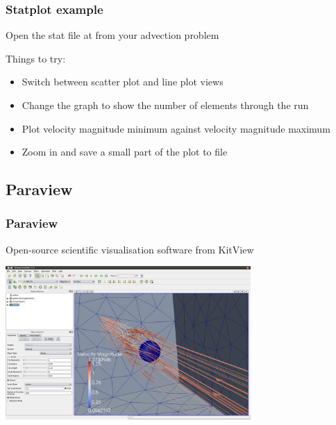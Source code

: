 \documentclass[12pt]{beamer}
\begin{document}
\begin{frame}
    \frametitle{Statplot example}
Open the stat file at from your advection problem

Things to try:
\begin{itemize}
\item Switch between scatter plot and line plot views
\item Change the graph to show the number of elements through the run
\item Plot velocity magnitude minimum against velocity magnitude maximum
\item Zoom in and save a small part of the plot to file
\end{itemize}
\end{frame}


\subsection{Paraview}
\begin{frame}
    \frametitle{Paraview}
Open-source scientific visualisation software from KitView
\begin{center}
\includegraphics[width=0.7\textwidth]{images/paraview_example.png}
\end{center}
\end{frame}
\end{document}

